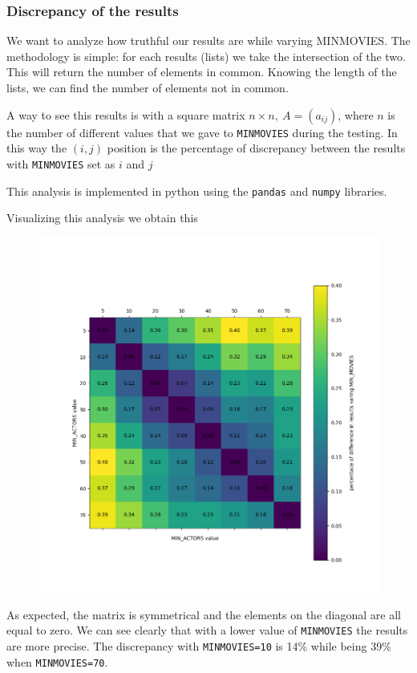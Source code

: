 \subsubsection{Discrepancy of the results}
We want to analyze how truthful our results are while varying MINMOVIES. The methodology is simple: for each results (lists) we take the intersection of the two. This will return the number of elements in common. Knowing the length of the lists, we can find the number of elements not in common. \s

\nd A way to see this results is with a square matrix $n \times n, ~ A = (a_{ij})$, where $n$ is the number of different values that we gave to \texttt{MINMOVIES} during the testing. In this way the $(i,j)$ position is the percentage of discrepancy between the results with \texttt{MINMOVIES} set as $i$ and $j$ \s

\nd This analysis is implemented in python using the \texttt{pandas} and \texttt{numpy} libraries.



\nd Visualizing this analysis we obtain this

\begin{figure}[h]
    \includegraphics[width=13cm]{Figure_1.png}
\end{figure}

\nd As expected, the matrix is symmetrical and the elements on the diagonal are all equal to zero. We can see clearly that with a lower value of \texttt{MINMOVIES} the results are more precise. The discrepancy with \texttt{MINMOVIES=10} is 14\% while being 39\% when \texttt{MINMOVIES=70}.
